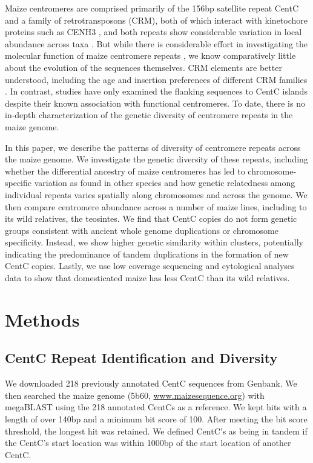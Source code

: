 Maize centromeres are comprised primarily of the 156bp satellite repeat CentC and a family of retrotransposons (CRM), both of which interact with  kinetochore proteins such as CENH3 \citep{Wolfgruber2009, Zhong2002}, and both repeats show considerable variation in local abundance across taxa \citep{Albert2010}.  But while there is considerable effort in investigating the molecular function of maize centromere repeats \citep{Ananiev1998B, Nagaki2003, Wolfgruber2009}, we know comparatively little about the evolution of the sequences themselves. CRM elements are better understood, including the age and insertion preferences of different CRM families \citep{Wolfgruber2009, Sharma2008}.  In contrast,  studies \citep{Wang2012} have only examined the flanking sequences to CentC islands despite their known association with functional centromeres.  To date, there is no in-depth characterization of the genetic diversity of centromere repeats in the maize genome.  

In this paper, we describe the patterns of diversity of centromere repeats across the maize genome.  We investigate the genetic diversity of these repeats, including whether the differential ancestry of maize centromeres \citep{Wang2012} has led to chromosome-specific variation as found in other species \citep{Kawabe2005, Pontes2004} and how genetic relatedness among individual repeats varies spatially along chromosomes and across the genome.  We then compare centromere abundance across a number of maize lines, including to its wild relatives, the teosintes.  We find that CentC copies do not form genetic groups consistent with ancient whole genome duplications or chromosome specificity.  Instead, we show higher genetic similarity within clusters, potentially indicating the predominance of tandem duplications in the formation of new CentC copies.  Lastly, we use low coverage sequencing and cytological analyses data to show that domesticated maize has less CentC than its wild relatives.

\section*{Methods}
\label{methods}

\subsection*{CentC Repeat Identification and Diversity}

We downloaded 218 previously annotated CentC sequences \citep{Ananiev1998B, Nagaki2003} from Genbank.  We then searched the maize genome (5b60, \url{www.maizesequence.org}) with megaBLAST \citep{McGinnis2004} using the 218 annotated CentCs as a reference.  We kept hits with a length of over 140bp and a minimum bit score of 100.  After meeting the bit score threshold, the longest hit was retained.  We defined CentC’s as being in tandem if the CentC’s start location was within 1000bp of the start location of another CentC.
	
